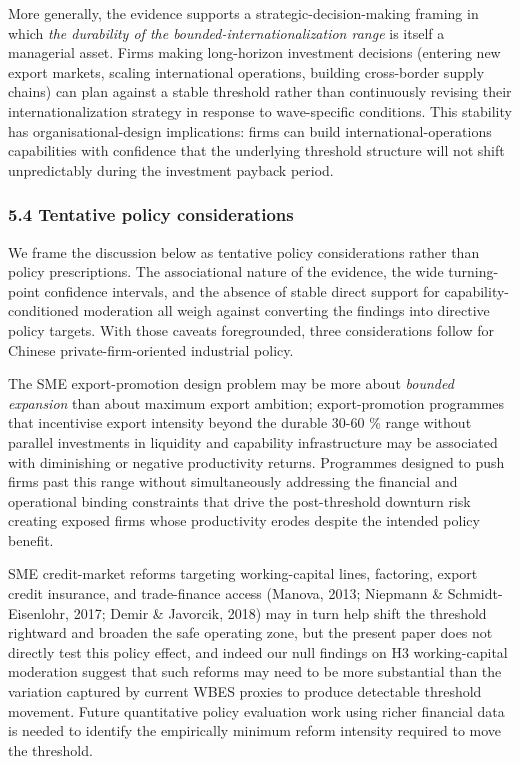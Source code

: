 \documentclass[12pt,a4paper]{article}
\begin{document}
More generally, the evidence supports a strategic-decision-making
framing in which \emph{the durability of the
bounded-internationalization range} is itself a managerial asset. Firms
making long-horizon investment decisions (entering new export markets,
scaling international operations, building cross-border supply chains)
can plan against a stable threshold rather than continuously revising
their internationalization strategy in response to wave-specific
conditions. This stability has organisational-design implications: firms
can build international-operations capabilities with confidence that the
underlying threshold structure will not shift unpredictably during the
investment payback period.

\hypertarget{54-tentative-policy-considerations}{%
\subsubsection{5.4 Tentative policy
considerations}\label{54-tentative-policy-considerations}}

We frame the discussion below as tentative policy considerations rather
than policy prescriptions. The associational nature of the evidence, the
wide turning-point confidence intervals, and the absence of stable
direct support for capability-conditioned moderation all weigh against
converting the findings into directive policy targets. With those
caveats foregrounded, three considerations follow for Chinese
private-firm-oriented industrial policy.

The SME export-promotion design problem may be more about \emph{bounded
expansion} than about maximum export ambition; export-promotion
programmes that incentivise export intensity beyond the durable 30-60 \%
range without parallel investments in liquidity and capability
infrastructure may be associated with diminishing or negative
productivity returns. Programmes designed to push firms past this range
without simultaneously addressing the financial and operational binding
constraints that drive the post-threshold downturn risk creating exposed
firms whose productivity erodes despite the intended policy benefit.

SME credit-market reforms targeting working-capital lines, factoring,
export credit insurance, and trade-finance access (Manova, 2013;
Niepmann \& Schmidt-Eisenlohr, 2017; Demir \& Javorcik, 2018) may in
turn help shift the threshold rightward and broaden the safe operating
zone, but the present paper does not directly test this policy effect,
and indeed our null findings on H3 working-capital moderation suggest
that such reforms may need to be more substantial than the variation
captured by current WBES proxies to produce detectable threshold
movement. Future quantitative policy evaluation work using richer
financial data is needed to identify the empirically minimum reform
intensity required to move the threshold.
\end{document}
